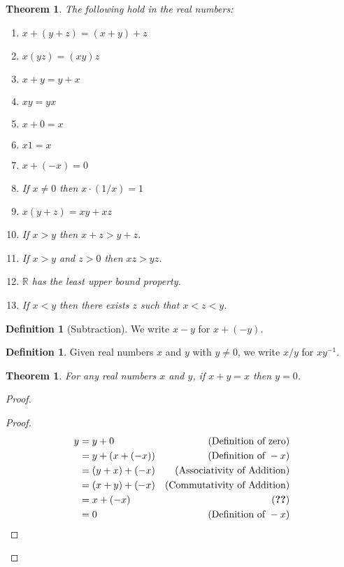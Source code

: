 \documentclass{book}
\let\qed\relax
\newtheorem{thm}[ax]{Theorem}
\theoremstyle{definition}
\newtheorem{df}[ax]{Definition}
\newcommand{\inv}[1]{\ensuremath{{#1}^{-1}}}
\begin{document}
\begin{thm}
The following hold in the real numbers:
\begin{enumerate}
\item $x + (y + z) = (x + y) + z$
\item $x(yz) = (xy)z$
\item $x + y = y + x$
\item $xy = yx$
\item $x + 0 = x$
\item $x1 = x$
\item $x + (-x) = 0$
\item If $x \neq 0$ then $x \cdot (1/x) = 1$
\item $x(y+z) = xy+xz$
\item If $x > y$ then $x + z > y + z$.
\item If $x > y$ and $z > 0$ then $xz > yz$.
\item $\mathbb{R}$ has the least upper bound property.
\item If $x < y$ then there exists $z$ such that $x < z < y$.
\end{enumerate}
\end{thm}


\begin{df}[Subtraction]
We write $x - y$ for $x + (-y)$.
\end{df}

\begin{df}
Given real numbers $x$ and $y$ with $y \neq 0$, we write $x/y$ for $x \inv{y}$.
\end{df}
\begin{thm}
\label{thm:y_equals_zero}
For any real numbers $x$ and $y$, if $x + y = x$ then $y = 0$.
\end{thm}

\begin{proof}
\pf
{}
\begin{proof}
	\pf
	\begin{align*}
		y & = y + 0 & (\text{Definition of zero}) \\
		& = y + (x + (-x)) & (\text{Definition of } -x) \\
		& = (y + x) + (-x) & (\text{Associativity of Addition}) \\
		& = (x + y) + (-x) & (\text{Commutativity of Addition}) \\
		& = x + (-x) & (\text{\stepref{2}}) \\
		& = 0 & (\text{Definition of } -x)
	\end{align*}
\end{proof}
\qed
\end{proof}
\end{document}
